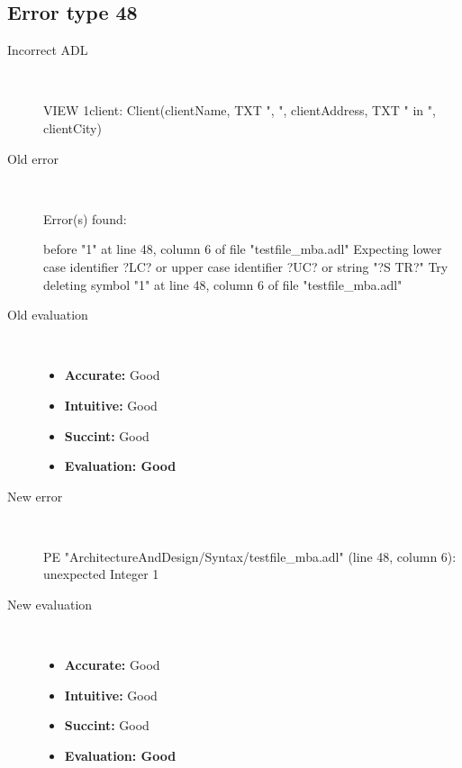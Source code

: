 \subsection{Error type 48}
  \begin{description}
  \item[Incorrect ADL]~\\
\begin{adl}
VIEW 1client: Client(clientName, TXT ", ", clientAddress, TXT " in ", clientCity)\end{adl}
  \item[Old error]~\\
\begin{haskell}
Error(s) found:

before "1" at line 48, column 6 of file "testfile_mba.adl"
Expecting lower case identifier ?LC? or upper case identifier ?UC? or string "?S
TR?"
Try deleting symbol "1" at line 48, column 6 of file "testfile_mba.adl"
\end{haskell}
  \item[Old evaluation]~\\
    \begin{itemize}
    \item \textbf{Accurate:} Good
    \item \textbf{Intuitive:} Good
    \item \textbf{Succint:} Good
    \item \textbf{Evaluation: Good}
    \end{itemize}
  \item[New error]~\\
\begin{haskell}
PE "ArchitectureAndDesign/Syntax/testfile_mba.adl" (line 48, column 6):
unexpected Integer 1\end{haskell}
  \item[New evaluation]~\\
    \begin{itemize}
    \item \textbf{Accurate:} Good
    \item \textbf{Intuitive:} Good
    \item \textbf{Succint:} Good
    \item \textbf{Evaluation: Good
}
    \end{itemize}
  \end{description}

\hrulefill

